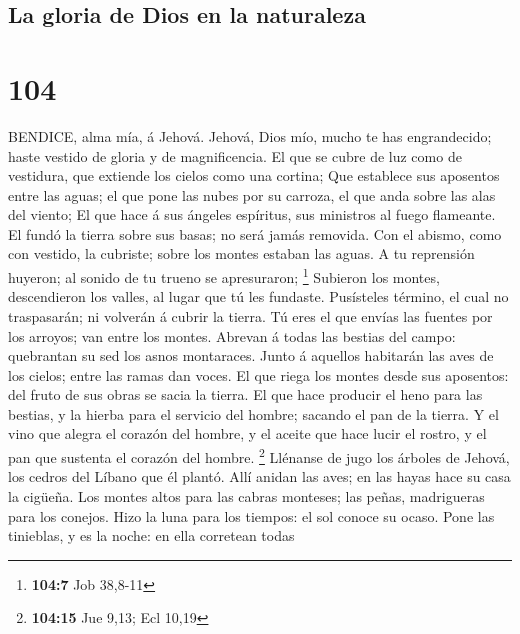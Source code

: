 \hypertarget{la-gloria-de-dios-en-la-naturaleza}{%
\subsection{La gloria de Dios en la
naturaleza}\label{la-gloria-de-dios-en-la-naturaleza}}

\hypertarget{section-103}{%
\section{104}\label{section-103}}

 BENDICE, alma mía, á Jehová. Jehová, Dios mío, mucho te has
engrandecido; haste vestido de gloria y de magnificencia. 
El que se cubre de luz como de vestidura, que extiende los cielos como
una cortina;  Que establece sus aposentos entre las aguas;
el que pone las nubes por su carroza, el que anda sobre las alas del
viento;  El que hace á sus ángeles espíritus, sus ministros
al fuego flameante.  El fundó la tierra sobre sus basas; no
será jamás removida.  Con el abismo, como con vestido, la
cubriste; sobre los montes estaban las aguas.  A tu
reprensión huyeron; al sonido de tu trueno se apresuraron; \footnote{\textbf{104:7}
  Job 38,8-11}  Subieron los montes, descendieron los
valles, al lugar que tú les fundaste.  Pusísteles término,
el cual no traspasarán; ni volverán á cubrir la tierra.  Tú
eres el que envías las fuentes por los arroyos; van entre los montes.
 Abrevan á todas las bestias del campo: quebrantan su sed
los asnos montaraces.  Junto á aquellos habitarán las aves
de los cielos; entre las ramas dan voces.  El que riega los
montes desde sus aposentos: del fruto de sus obras se sacia la tierra.
 El que hace producir el heno para las bestias, y la hierba
para el servicio del hombre; sacando el pan de la tierra. 
Y el vino que alegra el corazón del hombre, y el aceite que hace lucir
el rostro, y el pan que sustenta el corazón del hombre. \footnote{\textbf{104:15}
  Jue 9,13; Ecl 10,19}  Llénanse de jugo los árboles de
Jehová, los cedros del Líbano que él plantó.  Allí anidan
las aves; en las hayas hace su casa la cigüeña.  Los montes
altos para las cabras monteses; las peñas, madrigueras para los conejos.
 Hizo la luna para los tiempos: el sol conoce su ocaso.
 Pone las tinieblas, y es la noche: en ella corretean todas
